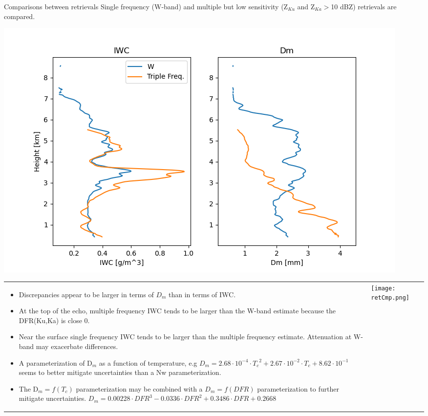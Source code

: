 \documentclass[final,t]{beamer}
\begin{document}
\begin{frame}
\begin{columns}[]

  \begin{column}{.32\linewidth}

  \begin{block}{Comparisons between retrievals}
   Single frequency (W-band) and multiple but low sensitivity (Z$_{Ku}$ and Z$_{Ka}>$10 dBZ) retrievals
   are compared.
  \end{block}
  
   \centerline{\includegraphics[scale=1.25,valign=t]{retrievedProfs.png}}
   
   
\begin{table}[]
\begin{tabular}{p{13cm}p{13cm}}
\begin{itemize}
\item
Discrepancies appear to be larger in terms of $D_m$ than in terms of IWC.
\item
At the top of the echo, multiple frequency IWC tends to be larger than the W-band estimate
because the DFR(Ku,Ka) is close 0.
\item
Near the surface single frequency IWC tends to be larger than the multiple frequency estimate.
Attenuation at W-band may exacerbate differences.
\item
A parameterization of D$_m$ as a function of temperature, e.g 
$D_m=2.68\cdot 10^{-4} \cdot {T_c}^2+2.67\cdot 10^{-2} \cdot {T_c}+8.62\cdot 10^{-1}$ seems to better mitigate
uncertainties than a Nw parameterization.
\item
The D$_m=f(T_c)$ parameterization may be combined with a $D_m=f(DFR)$ parameterization to further mitigate uncertainties.
$D_m=0.00228\cdot DFR^3 -0.0336 \cdot DFR^2+0.3486\cdot DFR+0.2668$
\end{itemize}
 &
 \texttt{[image: retCmp.png]}\\
 \end{tabular}
 

\end{table}
\end{column}
\end{columns}
\end{frame}
\end{document}
